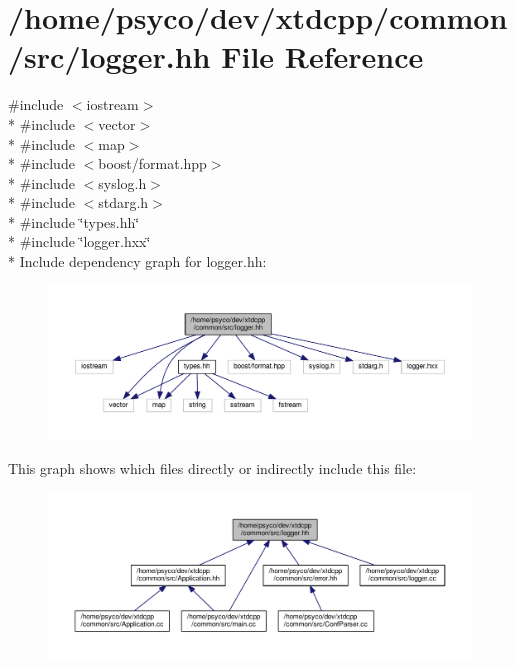 \hypertarget{logger_8hh}{}\section{/home/psyco/dev/xtdcpp/common/src/logger.hh File Reference}
\label{logger_8hh}
{\ttfamily \#include $<$iostream$>$}\\*
{\ttfamily \#include $<$vector$>$}\\*
{\ttfamily \#include $<$map$>$}\\*
{\ttfamily \#include $<$boost/format.\+hpp$>$}\\*
{\ttfamily \#include $<$syslog.\+h$>$}\\*
{\ttfamily \#include $<$stdarg.\+h$>$}\\*
{\ttfamily \#include \char`\"{}types.\+hh\char`\"{}}\\*
{\ttfamily \#include \char`\"{}logger.\+hxx\char`\"{}}\\*
Include dependency graph for logger.\+hh\+:
\nopagebreak
\begin{figure}[H]
\begin{center}
\leavevmode
\includegraphics[width=350pt]{logger_8hh__incl}
\end{center}
\end{figure}
This graph shows which files directly or indirectly include this file\+:
\nopagebreak
\begin{figure}[H]
\begin{center}
\leavevmode
\includegraphics[width=350pt]{logger_8hh__dep__incl}
\end{center}
\end{figure}
